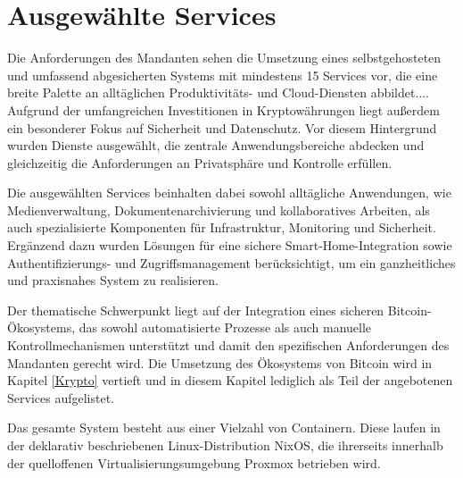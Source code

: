 \section{Ausgewählte Services}
Die Anforderungen des Mandanten sehen die Umsetzung eines selbstgehosteten und umfassend abgesicherten Systems mit mindestens 15 Services vor, die \glqq eine breite Palette an alltäglichen Produktivitäts- und Cloud-Diensten abbildet...\grqq. Aufgrund der umfangreichen Investitionen in Kryptowährungen liegt außerdem ein besonderer Fokus auf Sicherheit und Datenschutz. Vor diesem Hintergrund wurden Dienste ausgewählt, die zentrale Anwendungsbereiche abdecken und gleichzeitig die Anforderungen an Privatsphäre und Kontrolle erfüllen. 

Die ausgewählten Services beinhalten dabei sowohl alltägliche Anwendungen, wie Medienverwaltung, Dokumentenarchivierung und kollaboratives Arbeiten, als auch spezialisierte Komponenten für Infrastruktur, Monitoring und Sicherheit. Ergänzend dazu wurden Lösungen für eine sichere Smart-Home-Integration sowie Authentifizierungs- und Zugriffsmanagement berücksichtigt, um ein ganzheitliches und praxisnahes System zu realisieren. 

Der thematische Schwerpunkt liegt auf der Integration eines sicheren Bitcoin-Ökosystems, das sowohl automatisierte Prozesse als auch manuelle Kontrollmechanismen unterstützt und damit den spezifischen Anforderungen des Mandanten gerecht wird. Die Umsetzung des Ökosystems von Bitcoin wird in Kapitel \ref{Krypto} vertieft und in diesem Kapitel lediglich als Teil der angebotenen Services aufgelistet.

Das gesamte System besteht aus einer Vielzahl von Containern. Diese laufen in der deklarativ beschriebenen Linux-Distribution NixOS, die ihrerseits innerhalb der quelloffenen Virtualisierungsumgebung Proxmox betrieben wird.

